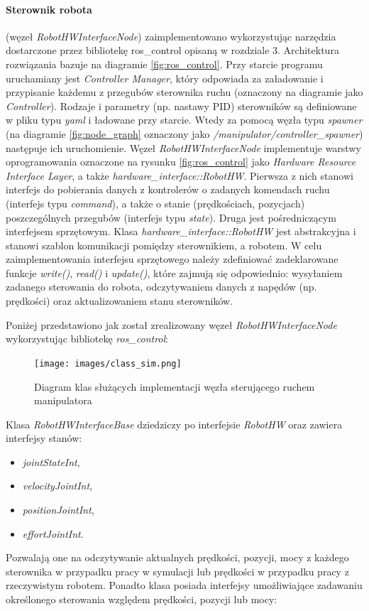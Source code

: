 \documentclass[a4paper, 12pt, twoside]{article}
\begin{document}
\paragraph{Sterownik robota} (węzeł \textit{RobotHWInterfaceNode}) zaimplementowano wykorzystując narzędzia dostarczone przez bibliotekę ros\_control opisaną w rozdziale 3. Architektura rozwiązania bazuje na diagramie \ref{fig:ros_control}. Przy starcie programu uruchamiany jest \textit{Controller Manager}, który odpowiada za załadowanie i przypisanie każdemu z przegubów sterownika ruchu (oznaczony na diagramie jako \textit{Controller}). Rodzaje i parametry (np. nastawy PID) sterowników są definiowane w pliku typu \textit{yaml} i ładowane przy starcie. Wtedy za pomocą węzła typu \textit{spawner} (na diagramie \ref{fig:node_graph} oznaczony jako \textit{/manipulator/controller\_spawner}) następuje ich uruchomienie. Węzeł \textit{RobotHWInterfaceNode} implementuje warstwy oprogramowania oznaczone na rysunku \ref{fig:ros_control} jako \textit{Hardware Resource Interface Layer}, a także \textit{hardware\_interface::RobotHW}. Pierwsza z nich stanowi interfejs do pobierania danych z kontrolerów o zadanych komendach ruchu (interfejs typu \textit{command}), a także o stanie (prędkościach, pozycjach) poszczególnych przegubów (interfejs typu \textit{state}). Druga jest pośredniczącym interfejsem sprzętowym. Klasa \textit{hardware\_interface::RobotHW} jest  abstrakcyjna i stanowi szablon komunikacji pomiędzy sterownikiem, a robotem. W celu zaimplementowania interfejsu sprzętowego należy zdefiniować zadeklarowane funkcje \textit{write()}, \textit{read()} i \textit{update()}, które zajmują się odpowiednio: wysyłaniem zadanego sterowania do robota, odczytywaniem danych z napędów (np. prędkości) oraz aktualizowaniem stanu sterowników.

Poniżej przedstawiono jak został zrealizowany węzeł \textit{RobotHWInterfaceNode} wykorzystując bibliotekę \textit{ros\_control}:

\begin{figure}[hbt!]
\centering
\texttt{[image: images/class\_sim.png]}
\caption{Diagram klas służących implementacji węzła sterującego ruchem manipulatora}
\label{fig:class_sim}
\end{figure}

Klasa \textit{RobotHWInterfaceBase} dziedziczy po interfejsie \textit{RobotHW} oraz zawiera interfejsy stanów:
\begin{itemize}
\item \textit{jointStateInt},
\item \textit{velocityJointInt},
\item \textit{positionJointInt},
\item \textit{effortJointInt}.
\end{itemize} 
Pozwalają one na odczytywanie aktualnych prędkości, pozycji, mocy z każdego sterownika w przypadku pracy w symulacji lub prędkości w przypadku pracy z rzeczywistym robotem. Ponadto klasa posiada interfejsy umożliwiające zadawaniu określonego sterowania względem prędkości, pozycji lub mocy:
\end{document}
